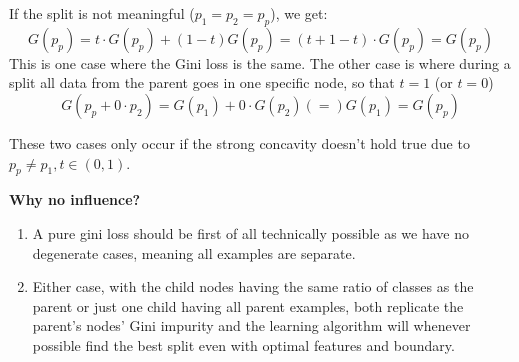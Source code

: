 \begin{answer}

    If the split is not meaningful ($p_1 = p_2 = p_p$), we get:
\[ G(p_p) = t \cdot G(p_p) + (1-t) G(p_p) = (t+1-t) \cdot G(p_p) = G(p_p) \]
This is one case where the Gini loss is the same.
The other case is where during a split all data from the parent goes in one specific node, so that $t=1$ (or $t=0$)
\[ G(p_p + 0 \cdot p_2) = G(p_1) + 0 \cdot G(p_2) (=) G(p_1) = G(p_p) \]

These two cases only occur if the strong concavity doesn't hold true due to $p_p \neq p_1, t \in (0,1)$.

\textbf{Why no influence?}
\begin{enumerate}[label=\arabic*)]
    \item A pure gini loss should be first of all technically possible as we have no degenerate cases, meaning all examples are separate.
    \item Either case, with the child nodes having the same ratio of classes as the parent or just one child having all parent examples, both replicate the parent's nodes' Gini impurity and the learning algorithm will whenever possible find the best split even with optimal features and boundary.
\end{enumerate}


\end{answer}